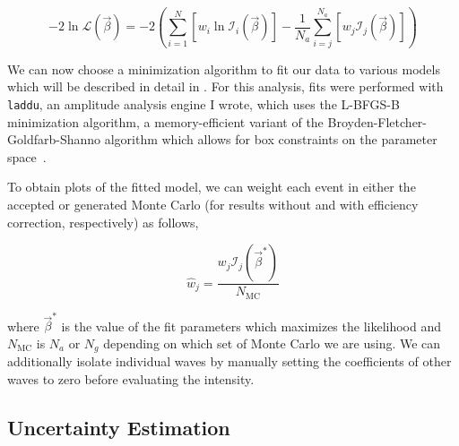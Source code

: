 \begin{equation}
  -2\ln\mathcal{L}(\vec{\beta}) = -2\left(\sum_{i=1}^N\left[w_i\ln\mathcal{I}_i(\vec{\beta})\right] - \frac{1}{N_a} \sum_{i=j}^{N_a}\left[w_j\mathcal{I}_j(\vec{\beta})\right]\right)
\end{equation}

We can now choose a minimization algorithm to fit our data to various models which will be described in detail in . For this analysis, fits were performed with \texttt{laddu}, an amplitude analysis engine I wrote, which uses the L-BFGS-B minimization algorithm, a memory-efficient variant of the Broyden-Fletcher-Goldfarb-Shanno algorithm which allows for box constraints on the parameter space~\cite{Byrd1995}.

To obtain plots of the fitted model, we can weight each event in either the accepted or generated Monte Carlo (for results without and with efficiency correction, respectively) as follows,

\begin{equation}
  \hat{w}_j = \frac{w_j \mathcal{I}_j(\vec{\beta}^*)}{N_\text{MC}}
\end{equation}

where $\vec{\beta}^*$ is the value of the fit parameters which maximizes the likelihood and $N_\text{MC}$ is $N_a$ or $N_g$ depending on which set of Monte Carlo we are using. We can additionally isolate individual waves by manually setting the coefficients of other waves to zero before evaluating the intensity.

\subsection{Uncertainty Estimation}

